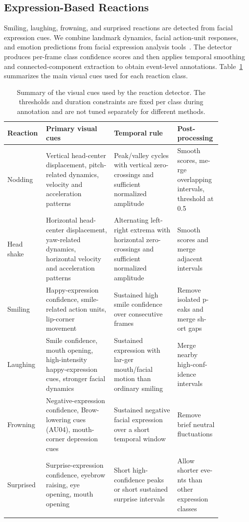 \subsection{Expression-Based Reactions}
\label{app:expression_reactions}

Smiling, laughing, frowning, and surprised reactions are detected from facial expression cues. We combine landmark dynamics, facial action-unit responses, and emotion predictions from facial expression analysis tools~\cite{pyfeat,goodfellow2013challenges}. The detector produces per-frame class confidence scores and then applies temporal smoothing and connected-component extraction to obtain event-level annotations. Table~\ref{tab:app_reaction_cues} summarizes the main visual cues used for each reaction class.

\begin{table}[t]
    \centering
    \small
    \caption{Summary of the visual cues used by the reaction detector. The thresholds and duration constraints are fixed per class during annotation and are not tuned separately for different methods.}
    \label{tab:app_reaction_cues}
    \begin{tabular}{p{0.12\linewidth}p{0.30\linewidth}p{0.28\linewidth}p{0.17\linewidth}}
        \Xhline{1.2pt}
        Reaction & Primary visual cues & Temporal rule & Post-processing \\
        \hline
        Nodding & Vertical head-center displacement, pitch-related dynamics, velocity and acceleration patterns & Peak/valley cycles with vertical zero-crossings and sufficient normalized amplitude & Smooth scores, me-rge overlapping intervals, threshold at 0.5 \\
        \hline
        Head shake & Horizontal head-center displacement, yaw-related dynamics, horizontal velocity and acceleration patterns & Alternating left-right extrema with horizontal zero-crossings and sufficient normalized amplitude & Smooth scores and merge adjacent intervals \\
        \hline
        Smiling & Happy-expression confidence, smile-related action units, lip-corner movement & Sustained high smile confidence over consecutive frames & Remove isolated p-eaks and merge sh-ort gaps \\
        \hline
        Laughing & Smile confidence, mouth opening, high-intensity happy-expression cues, stronger facial dynamics & Sustained expression with lar-ger mouth/facial motion than ordinary smiling & Merge nearby high-conf-idence intervals \\
        \hline
        Frowning & Negative-expression confidence, Brow-lowering cues (AU04), mouth-corner depression cues & Sustained negative facial expression over a short temporal window & Remove brief neutral fluctuations \\
        \hline
        Surprised & Surprise-expression confidence, eyebrow raising, eye opening, mouth opening & Short high-confidence peaks or short sustained surprise intervals & Allow shorter eve-nts than other expression classes \\
        \Xhline{1.2pt}
    \end{tabular}
\end{table}

